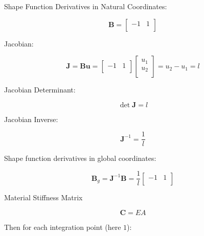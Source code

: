 \documentclass[10pt,b5paper,titlepage]{book}
\newcommand{\m}{\mathbf}
\begin{document}
Shape Function Derivatives in Natural Coordinates:

\begin{equation}
    \m{B} = \begin{bmatrix}
        -1 & 1 \\
    \end{bmatrix}
\end{equation}

Jacobian:

\begin{equation}
    \m{J} = \m{B} \m{u} = \begin{bmatrix}
        -1 & 1 \\
    \end{bmatrix}
    \begin{bmatrix}
        u_1 \\
        u_2 \\
    \end{bmatrix}
    = u_2 - u_1 = l
\end{equation}

Jacobian Determinant:

\begin{equation}
    \det \m{J} = l
\end{equation}

Jacobian Inverse:

\begin{equation}
    \m{J}^{-1} = \frac{1}{l}
\end{equation}

Shape function derivatives in global coordinates:

\begin{equation}
    \m{B}_g = \m{J}^{-1} \m{B} = \frac{1}{l}
    \begin{bmatrix}
        -1 & 1 \\
    \end{bmatrix}
\end{equation}

Material Stiffness Matrix

\begin{equation}
    \m{C} = EA
\end{equation}

Then for each integration point (here $1$):
\end{document}
